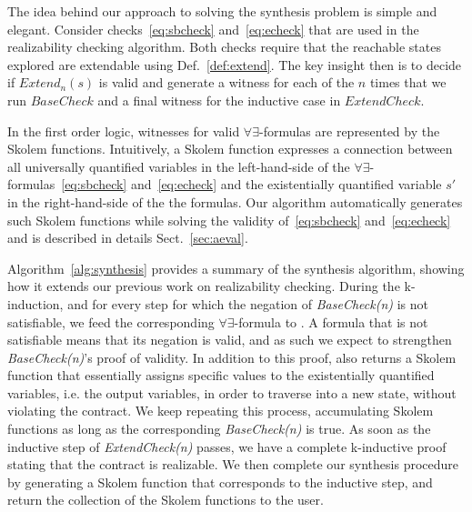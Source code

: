 The idea behind our approach to solving the synthesis problem is
simple and elegant. Consider checks~\eqref{eq:sbcheck} and~\eqref{eq:echeck} that
are used in the realizability checking algorithm. Both checks require
that the reachable states explored are extendable using
Def.~\ref{def:extend}.
The key insight then is to decide if $\mathit{Extend}_{n}(s)$ is valid and generate a witness 
for each of the $n$ times that we run $\mathit{BaseCheck}$ and a final witness 
for the inductive case in $\mathit{ExtendCheck}$.

In the first order logic, witnesses for valid $\forall\exists$-formulas are represented by the Skolem functions.
Intuitively, a Skolem function expresses a connection between all universally quantified variables in the left-hand-side of the $\forall\exists$-formulas~\eqref{eq:sbcheck} and~\eqref{eq:echeck} and the existentially quantified variable $s'$ in the right-hand-side of the the formulas.
Our algorithm automatically generates such Skolem functions
while solving the validity of~\eqref{eq:sbcheck} and~\eqref{eq:echeck} and is described in details Sect.~\ref{sec:aeval}.

\synthesisalgorithm


Algorithm~\ref{alg:synthesis} provides a summary of the synthesis algorithm,
showing how it extends our previous work on realizability checking. During the
k-induction, 
and for every step for which the negation of \textit{BaseCheck(n)}
is not satisfiable, we feed the corresponding $\forall\exists$-formula to
\aeval. A formula that is not satisfiable means that its negation is valid, and
as such we expect \aeval to strengthen \textit{BaseCheck(n)}'s
proof of validity. In addition to this proof, \aeval also returns a
Skolem function that essentially assigns specific values to the existentially quantified
variables, i.e. the output variables, in order to traverse into a
new state, without violating the contract. We keep repeating this process,
accumulating Skolem functions as long as the corresponding
\textit{BaseCheck(n)} is true. As soon as the inductive
step of \textit{ExtendCheck(n)} passes, we have a complete k-inductive proof
stating that the contract is realizable. We then complete our synthesis
procedure by generating a Skolem function that corresponds to the inductive
step, and return the collection of the Skolem functions to the user.



